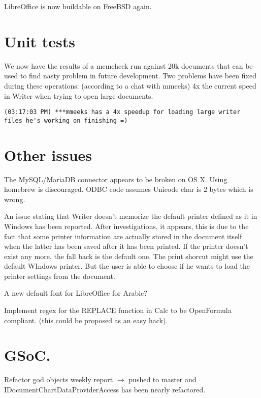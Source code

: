 \documentclass{article}
\begin{document}
LibreOffice is now buildable on FreeBSD again\cite{freeBsdBuild1}\cite{freeBsdBuild2}.

\section{Unit tests}

We now have the results of a memcheck run against 20k documents that can
be used to find nasty problem in future development\cite{memcheckTests}. Two problems
have been fixed during these operations: (according to a chat with
mmeeks) 4x the current speed in Writer when trying to open large documents.

\begin{lstlisting}
(03:17:03 PM) ***mmeeks has a 4x speedup for loading large writer files he's working on finishing =)
\end{lstlisting}


\section{Other issues}

The MySQL/MariaDB connector appears to be broken on OS X. Using homebrew
is discouraged. ODBC code assumes Unicode char is 2 bytes which is wrong.


An issue stating that Writer doesn't memorize the default printer
defined as it in Windows has been reported. After investigations, it
appears, this is due to the fact that some printer information are
actually stored in the document itself when the latter has been saved
after it has been printed. If the printer doesn't exist any more, the
fall back is the default one\cite{writerPrinter1}. The print shorcut might use the
default WIndows printer\cite{writerPrinter2}. But the user is able to choose if he wants
to load the printer settings from the document\cite{writerPrinter3}.

A new default font for LibreOffice for Arabic?\cite{arabicFont}


Implement regex for the REPLACE function in Calc to be OpenFormula
compliant. (this could be proposed as an easy hack)\cite{replaceRegexOpenFormula}.


\section{GSoC.}

Refactor god objects weekly report $\rightarrow$ pushed to master and
IDocumentChartDataProviderAccess has been nearly refactored.
\end{document}
